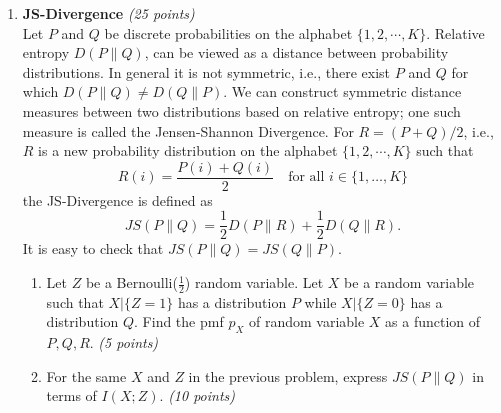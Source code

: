 \documentclass[12pt]{article}
\begin{document}
\begin{enumerate}
\begin{solution}
\begin{enumerate}
The expected number of tastings required is
\begin{eqnarray*}
   \sum_{i=1}^{6}p_{i}l_{i} & = & 2 \times \frac{8}{23} + 2 \times \frac{6}{23} + 2 \times \frac{4}{23} + 3 \times \frac{2}{23} + 4 \times \frac{2}{23} + 4 \times \frac{1}{23} \\
                            & = & \frac{54}{23} \\
                            & \approx & 2.35
\end{eqnarray*}
The mixture of the first and second bottles should be tasted first (or equivalently, the mixture of the third, fourth, fifth, and sixth). This splits the probability mass as evenly as possible based on the first branching of the Huffman tree.

\end{enumerate}

\end{solution}

\begin{problem}
    ~
    \clearpage
\end{problem}


\item  {\bf JS-Divergence} {\it (25 points)}\\
Let $P$ and $Q$ be discrete probabilities on the alphabet $\{1,2,\cdots,K\}$.
Relative entropy $D(P\|Q)$, can be viewed as a distance between probability distributions.
In general it is not symmetric, i.e., there exist $P$ and $Q$ for which  $D(P\|Q) \neq D(Q\|P)$.
We can construct symmetric distance measures between two distributions based on relative entropy;
one such measure is called the Jensen-Shannon Divergence. 
For $R = (P+Q)/2$, i.e., $R$ is a new probability distribution on the alphabet $\{1, 2, \cdots, K\}$ such that
\[
R(i) = \frac{P(i)+Q(i)}{2} \quad\mbox{for all $i\in\{1, \dots, K\}$}
\]
the JS-Divergence is defined as
\[ 
JS(P\|Q) = \frac{1}{2}D \left( P \| R  \right)+ \frac{1}{2}D\left( Q\|R \right).
\] 
It is easy to check that $JS(P\|Q) = JS(Q\|P)$.

\begin{enumerate}
\item Let $Z$ be a Bernoulli($\frac{1}{2}$) random variable. Let $X$ be a random variable such that $X|\{Z=1\}$ has a distribution $P$
while $X|\{Z=0\}$ has a distribution $Q$.
Find the pmf $p_X$ of random variable $X$ as a function of $P, Q, R$. {\it (5 points)}

\item For the same $X$ and $Z$ in the previous problem, express $JS(P\|Q)$ in terms of $I(X;Z)$. {\it (10 points)}


\end{enumerate}
\end{enumerate}
\end{document}
